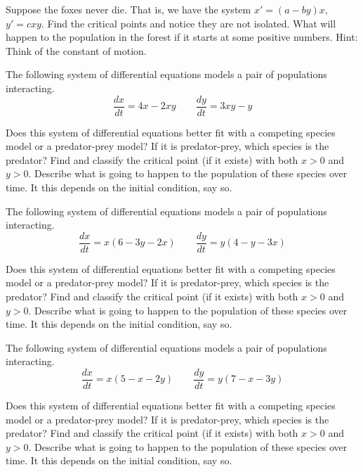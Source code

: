 \begin{exercise}[challenging]\ansMark%
Suppose the foxes never die.  That is, we have the system $x' = (a-by)x,$ $y' = cxy$.
Find the critical points and notice they are not isolated.  
What will happen to the population in the forest if it starts at some
positive numbers.  Hint: Think of the constant of motion.
\end{exercise}

\begin{exercise}
The following system of differential equations models a pair of populations interacting. 
\[ \frac{dx}{dt} = 4x - 2xy \qquad \frac{dy}{dt} = 3xy - y \]
\begin{tasks}
\task Does this system of differential equations better fit with a competing species model or a predator-prey model? If it is predator-prey, which species is the predator?
\task Find and classify the critical point (if it exists) with both $x>0$ and $y>0$.
\task Describe what is going to happen to the population of these species over time. It this depends on the initial condition, say so.
\end{tasks}
\end{exercise}

\begin{exercise}
The following system of differential equations models a pair of populations interacting. 
\[ \frac{dx}{dt} = x(6 - 3y - 2x)  \qquad \frac{dy}{dt} = y(4 - y - 3x) \]
\begin{tasks}
\task Does this system of differential equations better fit with a competing species model or a predator-prey model? If it is predator-prey, which species is the predator?
\task Find and classify the critical point (if it exists) with both $x>0$ and $y>0$.
\task Describe what is going to happen to the population of these species over time. It this depends on the initial condition, say so.
\end{tasks}
\end{exercise}

\begin{exercise}
The following system of differential equations models a pair of populations interacting. 
\[ \frac{dx}{dt} = x(5 - x - 2y)\qquad \frac{dy}{dt} = y(7 - x - 3y) \]
\begin{tasks}
\task Does this system of differential equations better fit with a competing species model or a predator-prey model? If it is predator-prey, which species is the predator?
\task Find and classify the critical point (if it exists) with both $x>0$ and $y>0$.
\task Describe what is going to happen to the population of these species over time. It this depends on the initial condition, say so.
\end{tasks}
\end{exercise}

